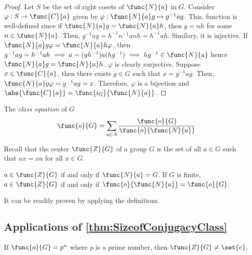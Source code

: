 \begin{proof}
    Let \(S\) be the set of right cosets of \(\func{N}{a}\) in \(G\). Consider \(\varphi : S \to \func{C}{a}\) given by \(\varphi: \func{N}{a}g \mapsto g^{-1}ag\). This, function is well-defined since if \(\func{N}{a}g = \func{N}{a}h\), then \(g = nh\) for some \(n \in \func{N}{a}\). Then, \(g^{-1}ag = h^{-1}n^{-1}anh = h^{-1}ah\). Similary, it is injective. If \(\func{N}{a}g \varphi = \func{N}{a}h \varphi\), then \(g^{-1}ag = h^{-1}a h \implies a=(gh^{-1})a (hg^{-1}) \implies hg^{-1} \in \func{N}{a}\) hence \(\func{N}{a}g = \func{N}{a}h\). \(\varphi\) is clearly surjective. Suppose \(x \in \func{C}{a}\), then there exists \(g \in G\) such that \(x = g^{-1}ag\). Then, \(\func{N}{a}g \varphi = g^{-1}ag = x\). Therefore, \(\varphi\) is a bijection and \(\abs{\func{C}{a}} = \func{i_G}{\func{N}{a}}\).
\end{proof}
\begin{corollary}\label{cor:classEquation}
    The \textit{class equation} of \(G\)
    \begin{equation*}
        \func{o}{G} = \sum_{a \in A} \dfrac{\func{o}{G}}{\func{o}{\func{N}{a}}}
    \end{equation*}
\end{corollary}

Recall that the center \(\func{Z}{G}\) of a group \(G\) is the set of all \(a \in G\) such that \(ax = xa\) for all \(x \in G\). 

\begin{lemma}
    \(a \in \func{Z}{G}\) if and only if \(\func{N}{a} = G\). If \(G\) is finite, \(a \in \func{Z}{G}\) if and only if \(\func{o}{\func{N}{a}} = \func{o}{G}\).
\end{lemma}

\begin{prooflemma}
    It can be readily proven by applying the definitions.
\end{prooflemma}

\subsection{Applications of \ref{thm:SizeofConjugacyClass}}

\begin{theorem}
    If \(\func{o}{G} = p^n\) where \(p\) is a prime number, then \(\func{Z}{G} \neq \set{e}\).
\end{theorem}

